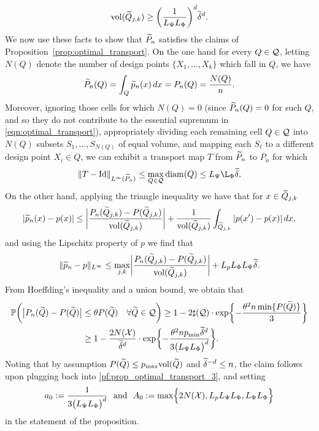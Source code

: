 \begin{equation}
\label{pf:prop_optimal_transport_2}
\text{vol}(\widetilde{Q}_{j,k}) \geq \biggl(\frac{1}{L_{\Psi} L_{\Phi}}\biggr)^d \widetilde{\delta}^d.
\end{equation}
We now use these facts to show that $\widetilde{P}_n$ satisfies the claims of Proposition~\ref{prop:optimal_transport}. On the one hand for every $Q \in \mathcal{Q}$, letting $N(Q)$ denote the number of design points $\{X_1,\ldots,X_k\}$ which fall in $Q$, we have
\begin{equation*}
\widetilde{P}_n(Q) = \int_{Q} \widetilde{p}_n(x) \,dx = P_n(Q) = \frac{N(Q)}{n}.
\end{equation*}
Moreover, ignoring those cells for which $N(Q) = 0$ (since $\widetilde{P}_n(Q) = 0$ for such $Q$, and so they do not contribute to the essential supremum in \eqref{eqn:optimal_transport}), appropriately dividing each remaining cell $Q \in \mathcal{Q}$ into $N(Q)$ subsets $S_1,\ldots,S_{N(Q)}$ of equal volume, and mapping each $S_{\ell}$ to a different design point $X_i \in Q$, we can exhibit a transport map $T$ from $\widetilde{P}_n$ to $P_n$ for which
\begin{equation*}
\|T - \mathrm{Id}\|_{L^{\infty}(\wt{P}_n)} \leq \max_{Q \in \mc{Q}} \diam(Q) \leq   L_{\Psi} \L_{\Phi} \wt{\delta}.
\end{equation*}
On the other hand, applying the triangle inequality we have that for $x \in \widetilde{Q}_{j,k}$
\begin{align*}
|\widetilde{p}_n(x) - p(x)| \leq \biggl|\frac{P_n(\widetilde{Q}_{j,k}) - P(\widetilde{Q}_{j,k})}{\text{vol}(\widetilde{Q}_{j,k})}\biggr| + \frac{1}{\text{vol}(\widetilde{Q}_{j,k})} \int_{\widetilde{Q}_{j,k}} |p(x') - p(x)| \,dx,
\end{align*}
and using the Lipschitz property of $p$ we find that 
\begin{equation}
\label{pf:prop_optimal_transport_3}
\|\widetilde{p}_n - p\|_{L^{\infty}} \leq \max_{j,k} \biggl|\frac{P_n(\widetilde{Q}_{j,k}) - P(\widetilde{Q}_{j,k})}{\text{vol}(\widetilde{Q}_{j,k})}\biggr| + L_p L_{\Phi} L_{\Psi} \widetilde{\delta}.
\end{equation}
From Hoeffding's inequality and a union bound, we obtain that 
\begin{align*}
\mathbb{P}\biggl( \bigl|P_n(\widetilde{Q}) - P(\widetilde{Q})\bigr| & \leq \theta P(\widetilde{Q}) \quad \forall \widetilde{Q} \in \mathcal{Q} \biggr) \geq 1 - 2 \sharp(\mathcal{Q}) \cdot \exp\biggl\{-\frac{\theta^2 n \min \{P(\widetilde{Q})\}}{3}\biggr\} \\
& \geq 1 - \frac{2 N(\mathcal{X})}{\widetilde{\delta}^d} \cdot \exp\biggl\{-\frac{\theta^2 n p_{\min} \widetilde{\delta}^d }{3\bigl(L_{\Psi} L_{\Phi}\bigr)^d}\biggr\}.
\end{align*}
Noting that by assumption $P(\widetilde{Q}) \leq p_{\max} \text{vol}(\widetilde{Q})$ and $\widetilde{\delta}^{-d} \leq n$, the claim follows upon plugging back into \eqref{pf:prop_optimal_transport_3}, and setting
\begin{equation*}
a_0 := \frac{1}{3\bigl(L_{\Psi} L_{\Phi}\bigr)^d}~~\textrm{and}~~A_0 := \max \Bigl\{2N(\mathcal{X}),L_p L_{\Psi} L_{\Phi}, L_{\Psi} L_{\Phi}\Bigr\}
\end{equation*}
in the statement of the proposition.

